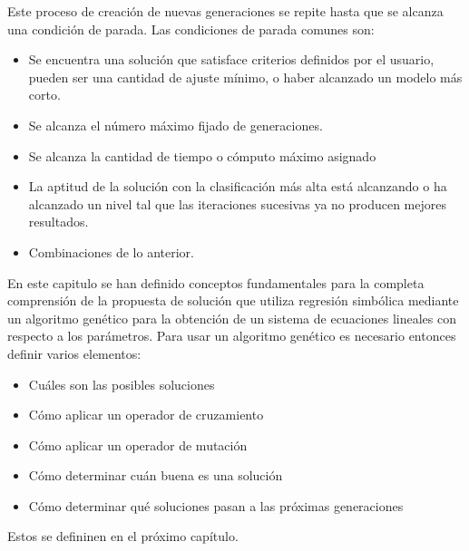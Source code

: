 Este proceso de creación de nuevas generaciones se repite hasta que se alcanza una condición de parada. Las condiciones de parada comunes son:

\begin{itemize}
    \item Se encuentra una solución que satisface criterios definidos por el usuario, pueden ser una cantidad de ajuste mínimo, o haber alcanzado un modelo más corto.
    \item Se alcanza el número máximo fijado de generaciones.
    \item Se alcanza la cantidad de tiempo o cómputo máximo asignado
    \item La aptitud de la solución con la clasificación más alta está alcanzando o ha alcanzado un nivel tal que las iteraciones sucesivas ya no producen mejores resultados.
    \item Combinaciones de lo anterior.
\end{itemize}

En este capitulo se han definido conceptos fundamentales para la completa comprensión de la propuesta de solución que utiliza regresión simbólica mediante un algoritmo genético para la obtención de un sistema de ecuaciones lineales con respecto a los parámetros. Para usar un algoritmo genético es necesario entonces definir varios elementos:

\begin{itemize}
    \item Cuáles son las posibles soluciones
    \item Cómo aplicar un operador de cruzamiento
    \item Cómo aplicar un operador de mutación
    \item Cómo determinar cuán buena es una solución
    \item Cómo determinar qué soluciones pasan a las próximas generaciones
\end{itemize}

Estos se defininen en el próximo capítulo.
